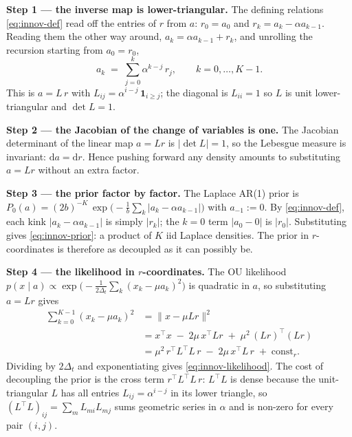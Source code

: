 \documentclass[11pt]{article}
\theoremstyle{definition}
\newcommand{\Detl}{\Delta_t}
\begin{document}
\begin{derivation}
\textbf{Step 1 --- the inverse map is lower-triangular.} The defining
relations \eqref{eq:innov-def} read off the entries of \(r\) from
\(a\): \(r_0 = a_0\) and \(r_k = a_k - \alpha a_{k - 1}\). Reading them
the other way around, \(a_k = \alpha a_{k - 1} + r_k\), and unrolling
the recursion starting from \(a_0 = r_0\),
\begin{equation}
    a_k \;=\; \sum_{j = 0}^{k} \alpha^{k - j}\, r_j,
    \qquad k = 0, \dots, K - 1.
\end{equation}
This is \(a = L\, r\) with \(L_{ij} = \alpha^{i - j}\, \mathbf{1}_{i
\geq j}\); the diagonal is \(L_{ii} = 1\) so \(L\) is unit
lower-triangular and \(\det L = 1\).

\textbf{Step 2 --- the Jacobian of the change of variables is one.}
The Jacobian determinant of the linear map \(a = L r\) is
\(|\det L| = 1\), so the Lebesgue measure is invariant:
\(\mathrm d a = \mathrm d r\). Hence pushing forward any density
amounts to substituting \(a = L r\) without an extra factor.

\textbf{Step 3 --- the prior factor by factor.} The Laplace AR(1)
prior is
\(P_0(a) = (2 b)^{-K}\, \exp\!\bigl(-\tfrac{1}{b} \sum_{k}
|a_k - \alpha a_{k - 1}|\bigr)\) with \(a_{-1} := 0\). By
\eqref{eq:innov-def}, each kink \(|a_k - \alpha a_{k - 1}|\) is simply
\(|r_k|\); the \(k = 0\) term \(|a_0 - 0|\) is \(|r_0|\). Substituting
gives \eqref{eq:innov-prior}: a product of \(K\) iid Laplace densities.
The prior in \(r\)-coordinates is therefore as decoupled as it can
possibly be.

\textbf{Step 4 --- the likelihood in \(r\)-coordinates.} The OU
likelihood \(p(x \mid a) \propto \exp\!\bigl(-\tfrac{1}{2 \Detl}
\sum_k (x_k - \mu a_k)^2\bigr)\) is quadratic in \(a\), so
substituting \(a = L r\) gives
\begin{align}
    \sum_{k = 0}^{K - 1} (x_k - \mu a_k)^2
        &= \|x - \mu L r\|^2 \nonumber \\
        &= x^\top x \;-\; 2 \mu\, x^\top L r \;+\; \mu^2\, (L r)^\top (L r) \nonumber \\
        &= \mu^2\, r^\top L^\top L\, r \;-\; 2 \mu\, x^\top L\, r
                                       \;+\; \text{const}_r.
\end{align}
Dividing by \(2 \Detl\) and exponentiating gives
\eqref{eq:innov-likelihood}. The cost of decoupling the prior is the
cross term \(r^\top L^\top L\, r\): \(L^\top L\) is dense because the
unit-triangular \(L\) has all entries \(L_{ij} = \alpha^{i - j}\) in
its lower triangle, so
\((L^\top L)_{ij} = \sum_{m} L_{mi} L_{mj}\) sums geometric series
in \(\alpha\) and is non-zero for every pair \((i, j)\).
\end{derivation}
\end{document}

